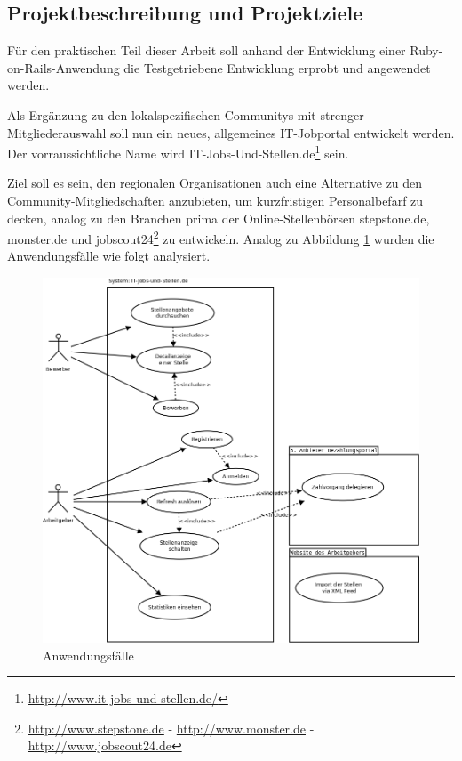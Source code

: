 \subsection{Projektbeschreibung und Projektziele}
Für den praktischen Teil dieser Arbeit soll anhand der Entwicklung einer Ruby-on-Rails-Anwendung die Testgetriebene Entwicklung erprobt und angewendet werden.

Als Ergänzung zu den lokalspezifischen Communitys mit strenger Mitgliederauswahl soll nun ein neues, allgemeines IT-Jobportal entwickelt werden. Der vorraussichtliche Name wird IT-Jobs-Und-Stellen.de\footnote{\url{http://www.it-jobs-und-stellen.de/}} sein.

Ziel soll es sein, den regionalen Organisationen auch eine Alternative zu den Community-Mitgliedschaften anzubieten, um kurzfristigen Personalbefarf zu decken, analog zu den Branchen prima der Online-Stellenbörsen stepstone.de, monster.de und jobscout24\footnote{\url{http://www.stepstone.de} - \url{http://www.monster.de} - \url{http://www.jobscout24.de}} zu entwickeln. Analog zu Abbildung \ref{fig:usecases} wurden die Anwendungsfälle wie folgt analysiert.


\begin{figure}[htbp]
 \centering
 \includegraphics[width=1\textwidth]{./material/usecases.png}
 \caption{Anwendungsfälle}
 \label{fig:usecases}
\end{figure}


